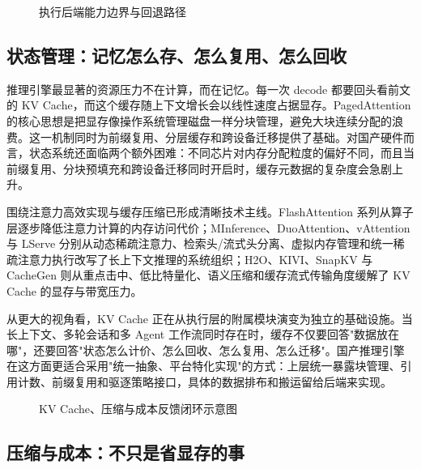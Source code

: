 \begin{figure}[!htb]
\centering
\resizebox{0.88\linewidth}{!}{}
\caption{执行后端能力边界与回退路径}
\label{fig:execution-backend-boundary}
\end{figure}

\subsection{状态管理：记忆怎么存、怎么复用、怎么回收}

推理引擎最显著的资源压力不在计算，而在记忆。每一次 decode 都要回头看前文的 KV Cache，而这个缓存随上下文增长会以线性速度占据显存。PagedAttention 的核心思想是把显存像操作系统管理磁盘一样分块管理，避免大块连续分配的浪费\citep{kwon2023efficient}。这一机制同时为前缀复用、分层缓存和跨设备迁移提供了基础。对国产硬件而言，状态系统还面临两个额外困难：不同芯片对内存分配粒度的偏好不同，而且当前缀复用、分块预填充和跨设备迁移同时开启时，缓存元数据的复杂度会急剧上升。

围绕注意力高效实现与缓存压缩已形成清晰技术主线。FlashAttention 系列从算子层逐步降低注意力计算的内存访问代价\citep{dao2022flashattention,dao2024flashattention2,shah2024flashattention3}；MInference、DuoAttention、vAttention 与 LServe 分别从动态稀疏注意力、检索头/流式头分离、虚拟内存管理和统一稀疏注意力执行改写了长上下文推理的系统组织\citep{jin2024minference,xiao2024duoattention,kwon2024vattention,yang2025lserve}；H2O、KIVI、SnapKV 与 CacheGen 则从重点击中、低比特量化、语义压缩和缓存流式传输角度缓解了 KV Cache 的显存与带宽压力\citep{zhang2023h2o,liu2024kivi,li2024snapkv,zhang2024cachegen}。

从更大的视角看，KV Cache 正在从执行层的附属模块演变为独立的基础设施。当长上下文、多轮会话和多 Agent 工作流同时存在时，缓存不仅要回答"数据放在哪"，还要回答"状态怎么计价、怎么回收、怎么复用、怎么迁移"。国产推理引擎在这方面更适合采用"统一抽象、平台特化实现"的方式：上层统一暴露块管理、引用计数、前缀复用和驱逐策略接口，具体的数据排布和搬运留给后端来实现。

\begin{figure}[!htb]
\centering
\resizebox{0.58\linewidth}{!}{}
\caption{KV Cache、压缩与成本反馈闭环示意图}
\label{fig:kv-cost-feedback-loop}
\end{figure}

\subsection{压缩与成本：不只是省显存的事}

